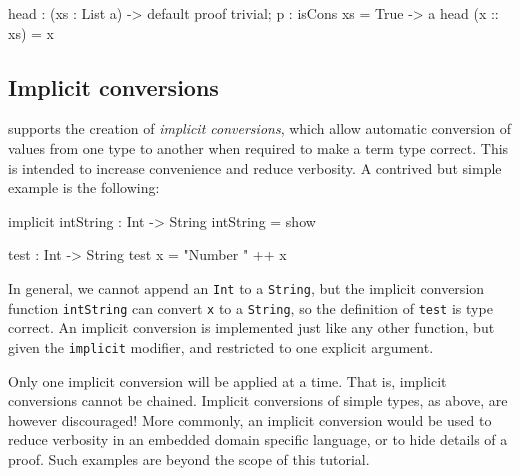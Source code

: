 \begin{code}
head : (xs : List a) -> 
       {default proof { trivial; } p : isCons xs = True} -> a
head (x :: xs) = x
\end{code} 

\subsection{Implicit conversions}

\Idris{} supports the creation of \emph{implicit conversions}, which allow automatic conversion of values from one type to another when required to make a term type correct.
This is intended to increase convenience and reduce verbosity. A contrived but simple example is the following:

\begin{code}
implicit intString : Int -> String
intString = show
  
test : Int -> String
test x = "Number " ++ x
\end{code}

\noindent
In general, we cannot append an \texttt{Int} to a \texttt{String}, but the implicit conversion function \texttt{intString} can convert \texttt{x} to a \texttt{String}, so the definition of \texttt{test} is type correct. 
An implicit conversion is implemented just like any other function, but given the \texttt{implicit} modifier, and restricted to one explicit argument.

Only one implicit conversion will be applied at a time.
That is, implicit conversions cannot be chained.
Implicit conversions of simple types, as above, are however discouraged!
More commonly, an implicit conversion would be used to reduce verbosity in an embedded domain specific language, or to hide details of a proof.
Such examples are beyond the scope of this tutorial.
